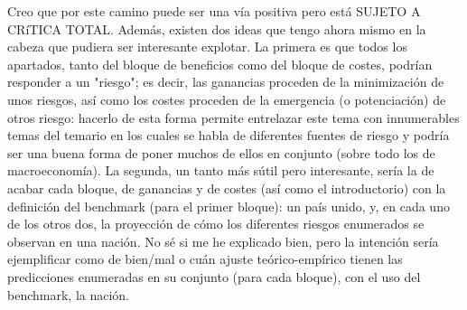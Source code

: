 \documentclass[10pt,a4paper]{article}
\begin{document}
{{    Creo que por este camino puede ser una vía positiva pero está SUJETO A CRíTICA TOTAL. Además, existen dos ideas que tengo ahora mismo en la cabeza que pudiera ser interesante explotar. La primera es que todos los apartados, tanto del bloque de beneficios como del bloque de costes, podrían responder a un "riesgo"; es decir, las ganancias proceden de la minimización de unos riesgos, así como los costes proceden de la emergencia (o potenciación) de otros riesgo: hacerlo de esta forma permite entrelazar este tema con innumerables temas del temario en los cuales se habla de diferentes fuentes de riesgo y podría ser una buena forma de poner muchos de ellos en conjunto (sobre todo los de macroeconomía). La segunda, un tanto más sútil pero interesante, sería la de acabar cada bloque, de ganancias y de costes (así como el introductorio) con la definición del benchmark (para el primer bloque): un país unido, y, en cada uno de los otros dos, la proyección de cómo los diferentes riesgos enumerados se observan en una nación. No sé si me he explicado bien, pero la intención sería ejemplificar como de bien/mal o cuán ajuste teórico-empírico tienen las predicciones enumeradas en su conjunto (para cada bloque), con el uso del benchmark, la nación. 

}}
\end{document}
